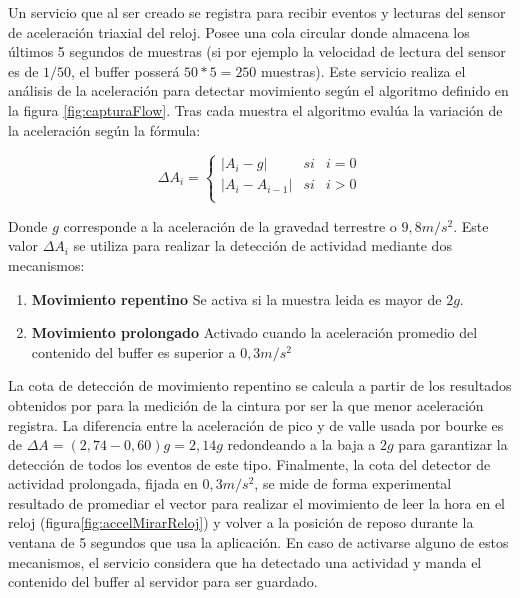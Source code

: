 Un servicio que al ser creado se registra para recibir eventos y lecturas del sensor de aceleración triaxial del reloj. Posee una cola circular donde almacena los últimos 5 segundos de muestras (si por ejemplo la velocidad de lectura del sensor es de $1/50$, el buffer posserá $50 * 5 = 250$ muestras).
Este servicio realiza el análisis de la aceleración para detectar movimiento según el algoritmo definido en la figura \ref{fig:capturaFlow}. Tras cada muestra el algoritmo evalúa la variación de la aceleración según la fórmula: 

\[
  \Delta A_{i}=\left\{
    \begin{array}{lcl}
      |A_i - g| & si & i = 0 \\
      |A_i - A_{i-1}| & si & i > 0 \\
    \end{array}
    \right.
\]

Donde $g$ corresponde a la aceleración de la gravedad terrestre o $9,8m/s^2$. Este valor $\Delta A_i$ se utiliza para realizar la detección de actividad mediante dos mecanismos:


\begin{enumerate}
  \item \textbf{Movimiento repentino} Se activa si la muestra leida es mayor de $2g$.
  \item \textbf{Movimiento prolongado} Activado cuando la aceleración promedio del contenido del buffer es superior a $0,3m/s^2$
\end{enumerate}

La cota de detección de movimiento repentino se calcula a partir de los resultados obtenidos por  para la medición de la cintura por ser la que menor aceleración registra. La diferencia entre la aceleración de pico y de valle usada por bourke es de $\Delta A = (2,74 - 0,60)g = 2,14g$ redondeando a la baja a $2g$ para garantizar la detección de todos los eventos de este tipo. Finalmente, la cota del detector de actividad prolongada, fijada en $0,3m/s^2$, se mide de forma experimental resultado de promediar el vector para realizar el movimiento de leer la hora en el reloj (figura\ref{fig:accelMirarReloj}) y volver a la posición de reposo durante la ventana de 5 segundos que usa la aplicación. En caso de activarse alguno de estos mecanismos, el servicio considera que ha detectado una actividad y manda el contenido del buffer al servidor para ser guardado. 

